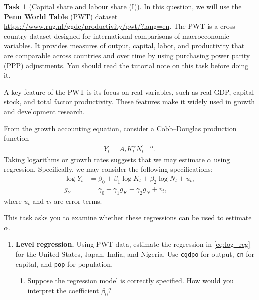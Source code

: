 \documentclass{book}
\theoremstyle{definition}
\newtheorem{task}{Task}[chapter]
\theoremstyle{plain}
\begin{document}
\begin{task}[Capital share and labour share (I)]\label{task:shares01}
    In this question, we will use the \textbf{Penn World Table} (PWT) dataset \url{https://www.rug.nl/ggdc/productivity/pwt/?lang=en}. The PWT is a cross-country dataset designed for international comparisons of macroeconomic variables. It provides measures of output, capital, labor, and productivity that are comparable across countries and over time by using purchasing power parity (PPP) adjustments. You should read the tutorial note on this task before doing it.
        
    A key feature of the PWT is its focus on real variables, such as real GDP, capital stock, and total factor productivity. These features make it widely used in growth and development research.
        
    \vspace{0.5em}
        
    From the growth accounting equation, consider a Cobb--Douglas production function
    \begin{align*}
        Y_t = A_t K_t^{\alpha} N_t^{1-\alpha}.
    \end{align*}
    Taking logarithms or growth rates suggests that we may estimate $\alpha$ using regression. Specifically, we may consider the following specifications:
    \begin{align}
        \log Y_t &= \beta_0 + \beta_1 \log K_t + \beta_2 \log N_t + u_t, \label{eq:log_reg} \\
        g_Y &= \gamma_0 + \gamma_1 g_K + \gamma_2 g_N + v_t, \label{eq:growth_reg}
    \end{align}
    where $u_t$ and $v_t$ are error terms. 
        
    This task asks you to examine whether these regressions can be used to estimate $\alpha$.
        
    \begin{enumerate}[label=\arabic*.]
        
    \item \textbf{Level regression.} Using PWT data, estimate the regression in \eqref{eq:log_reg} for the United States, Japan, India, and Nigeria. Use \texttt{cgdpo} for output, \texttt{cn} for capital, and \texttt{pop} for population.
        
        \begin{enumerate}[label=\roman*.]
        
        \item Suppose the regression model is correctly specified. How would you interpret the coefficient $\beta_0$?
        

\end{enumerate}
\end{enumerate}
\end{task}
\end{document}
